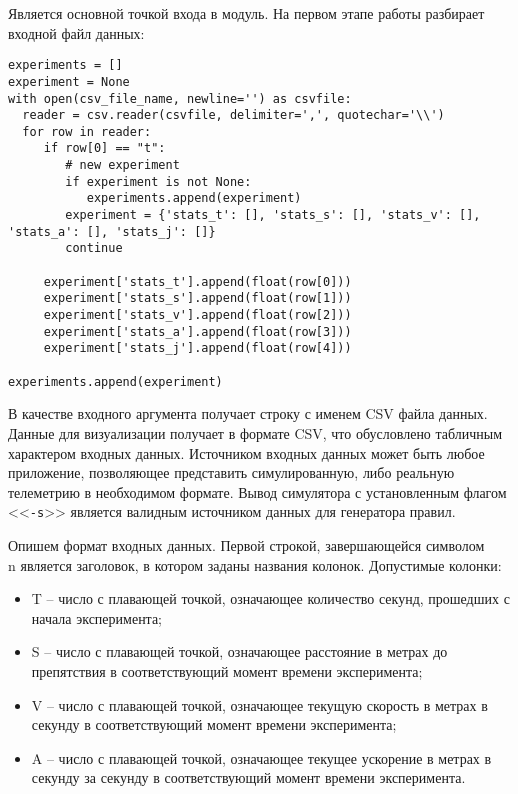 Является основной точкой входа в модуль. На первом этапе работы разбирает входной файл данных:

\begin{lstlisting}[style=pythonstyle,caption={  }, label=lst:func:1]
experiments = []
experiment = None
with open(csv_file_name, newline='') as csvfile:
  reader = csv.reader(csvfile, delimiter=',', quotechar='\\')
  for row in reader:
     if row[0] == "t":
        # new experiment
        if experiment is not None:
           experiments.append(experiment)
        experiment = {'stats_t': [], 'stats_s': [], 'stats_v': [], 'stats_a': [], 'stats_j': []}
        continue

     experiment['stats_t'].append(float(row[0]))
     experiment['stats_s'].append(float(row[1]))
     experiment['stats_v'].append(float(row[2]))
     experiment['stats_a'].append(float(row[3]))
     experiment['stats_j'].append(float(row[4]))

experiments.append(experiment)
\end{lstlisting}


В качестве входного аргумента получает строку с именем CSV файла данных. Данные для визуализации получает в формате CSV, что обусловлено табличным характером входных данных. Источником входных данных может быть любое приложение, позволяющее представить симулированную, либо реальную телеметрию в необходимом формате. Вывод симулятора с установленным флагом <<\lstinline!-s!>> является валидным источником данных для генератора правил.

Опишем формат входных данных. Первой строкой, завершающейся символом \\n является заголовок, в котором заданы названия колонок. Допустимые колонки:

\begin{itemize}
	\item T – число с плавающей точкой, означающее количество секунд, прошедших с начала эксперимента;
	\item S – число с плавающей точкой, означающее расстояние в метрах до препятствия в соответствующий момент времени эксперимента;
	\item V – число с плавающей точкой, означающее текущую скорость в метрах в секунду в соответствующий момент времени эксперимента;
	\item A – число с плавающей точкой, означающее текущее ускорение в метрах в секунду за секунду в соответствующий момент времени эксперимента.
\end{itemize}

